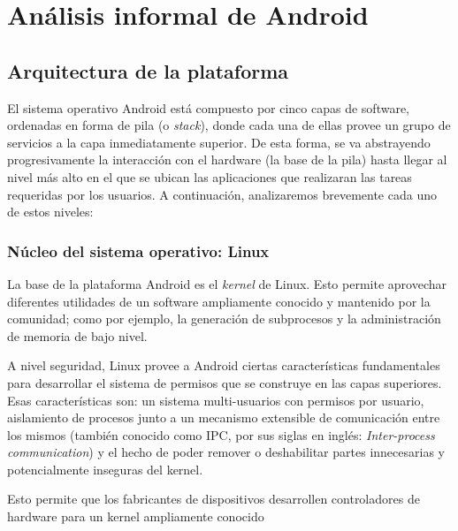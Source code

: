 \chapter{Análisis informal de Android}
\label{chapter:background}

\section{Arquitectura de la plataforma}
\label{section:architecture}

El sistema operativo Android está compuesto por cinco capas de software, ordenadas en forma de pila (o
\textit{stack}), donde cada una de ellas provee un grupo de servicios a la capa inmediatamente
superior. De esta forma, se va abstrayendo progresivamente la interacción con el hardware (la base de
la pila) hasta llegar al nivel más alto en el que se ubican las aplicaciones que realizaran las tareas
requeridas por los usuarios. A continuación, analizaremos brevemente cada uno de estos niveles:

\subsection{Núcleo del sistema operativo: Linux}
La base de la plataforma Android es el \textit{kernel} de Linux. Esto permite aprovechar diferentes
utilidades de un software ampliamente conocido y mantenido por la comunidad; como por ejemplo, la
generación de subprocesos y la administración de memoria de bajo nivel.

A nivel seguridad, Linux provee a Android ciertas características fundamentales para desarrollar el
sistema de permisos que se construye en las capas superiores. Esas características son: un sistema
multi-usuarios con permisos por usuario, aislamiento de procesos junto a un mecanismo extensible de
comunicación entre los mismos (también  conocido como IPC, por sus siglas en inglés:
\textit{Inter-process communication}) y el hecho de poder remover o deshabilitar partes innecesarias y
potencialmente inseguras del kernel.

Esto permite que los fabricantes de
dispositivos desarrollen controladores de hardware para un kernel ampliamente conocido



